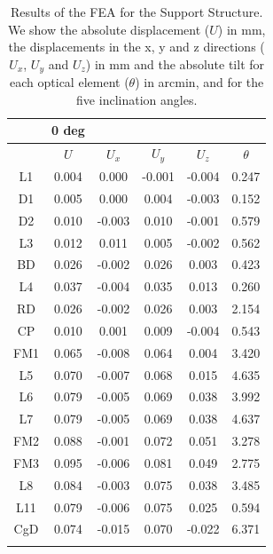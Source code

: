 \documentclass{report}
\begin{document}
\begin{table}
\caption{Results of the FEA for the Support Structure. We show the absolute displacement ($U$) in mm, the displacements in the x, y and z directions ($U_x$, $U_y$ and $U_z$) in mm and the absolute tilt for each optical element ($\theta$) in arcmin, and for the five inclination angles.}
\label{table:FEAsupportstructure}
\begin{center}
\small
\begin{tabular}{c|ccccc}
& {\bf 0 deg} & & & & \\
\hline
\hline
& $U$ & $U_x$ & $U_y$ & $U_z$ & $\theta$ \\
\hline
L1	&	0.004	&	0.000	&	-0.001	&	-0.004	&	0.247	\\
D1	&	0.005	&	0.000	&	0.004	&	-0.003	&	0.152	\\
D2	&	0.010	&	-0.003	&	0.010	&	-0.001	&	0.579	\\
L3	&	0.012	&	0.011	&	0.005	&	-0.002	&	0.562	\\
BD	&	0.026	&	-0.002	&	0.026	&	0.003	&	0.423	\\
L4	&	0.037	&	-0.004	&	0.035	&	0.013	&	0.260	\\
RD	&	0.026	&	-0.002	&	0.026	&	0.003	&	2.154	\\
CP	&	0.010	&	0.001	&	0.009	&	-0.004	&	0.543	\\
FM1	&	0.065	&	-0.008	&	0.064	&	0.004	&	3.420	\\
L5	&	0.070	&	-0.007	&	0.068	&	0.015	&	4.635	\\
L6	&	0.079	&	-0.005	&	0.069	&	0.038	&	3.992	\\
L7	&	0.079	&	-0.005	&	0.069	&	0.038	&	4.637	\\
FM2	&	0.088	&	-0.001	&	0.072	&	0.051	&	3.278	\\
FM3	&	0.095	&	-0.006	&	0.081	&	0.049	&	2.775	\\
L8	&	0.084	&	-0.003	&	0.075	&	0.038	&	3.485	\\
L11	&	0.079	&	-0.006	&	0.075	&	0.025	&	0.594	\\
CgD	&	0.074	&	-0.015	&	0.070	&	-0.022	&	6.371	\\
\hline \\
\end{tabular}
\end{center}
\end{table}

\clearpage
\end{document}
